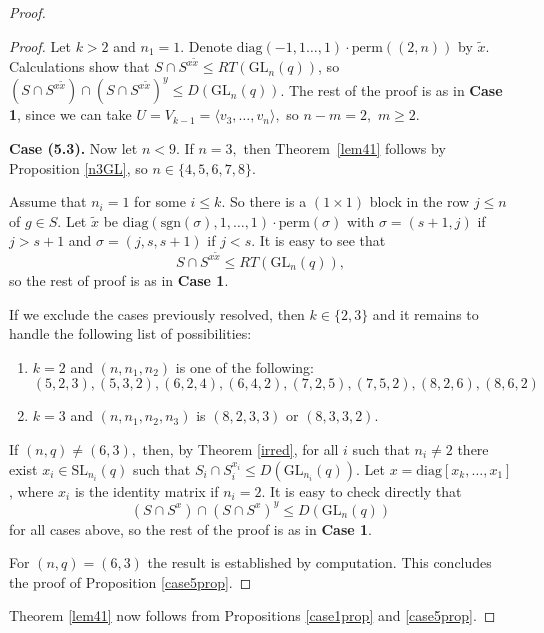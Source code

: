 \documentclass[a4paper,reqno,11pt]{amsart}
\theoremstyle{definition}
\theoremstyle{remark}
\numberwithin{equation}{section}
\newcommand{\diag}{\mathrm{diag}}
\newcommand{\sgn}{\mathrm{sgn}}
\newcommand{\per}{\mathrm{perm}}
\newcommand{\SL}{{\mathrm{SL}}}
\newcommand{\GL}{{\mathrm{GL}}}
\begin{document}
\begin{proof}
\begin{proof}
Let $k>2$ and $n_1=1.$ Denote $\diag(-1,1\ldots,1) \cdot \per((2,n))$ by $\tilde{x}$. Calculations show that  $S \cap S^{x \tilde{x}} \le RT(\GL_n(q))$, so $(S \cap S^{x \tilde{x}}) \cap (S \cap S^{x \tilde{x}})^y\le D(\GL_n(q))$. The rest of the proof is  as in {\bf Case 1}, since we can take $U=V_{k-1}=\langle v_3, \ldots, v_n \rangle,$ so $n-m=2,$ $m\ge 2.$

\medskip

{\bf Case (5.3).}  Now let $n<9.$ If $n=3,$ then Theorem~\ref{lem41} follows by Proposition \ref{n3GL}, so $n \in \{4,5,6,7,8\}$.

Assume that $n_i=1$ for some $i\le k$. So there is a $(1\times 1)$ block in the row $j \le n$ of $g \in S$. Let $\tilde{x}$ be $\diag(\sgn(\sigma), 1, \ldots, 1) \cdot \per(\sigma)$ with $\sigma=(s+1,j)$ if $j>s+1$ and  $\sigma=(j,s,s+1)$ if $j<s.$ It is easy to see that 
$$S \cap S^{x \tilde x}\le RT(\GL_n(q)),$$
so the rest of proof is  as in {\bf Case 1}.

If we exclude the cases previously resolved, then $k \in \{2,3\}$ and it remains to handle the following list of possibilities:
\begin{enumerate}
\item[$(a)$] $k=2$ and $(n,n_1,n_2)$ is one of the following:
$$(5,2,3), (5,3,2), (6,2,4), (6,4,2), (7,2,5), (7,5,2), (8,2,6), (8,6,2)$$
\item[$(b)$] $k=3$ and $(n, n_1, n_2, n_3)$ is $(8,2,3,3)$ or $(8,3,3,2).$
\end{enumerate}
If $(n,q) \ne (6,3),$ then, by Theorem \ref{irred}, for all $i$ such that $n_i\ne 2$  there exist $x_i \in \SL_{n_i}(q)$ such that $S_i \cap S_i^{x_i} \le D(\GL_{n_i}(q))$. Let $x=\diag[x_k, \ldots, x_1]$, where $x_i$ is the identity matrix  if $n_i=2$. It is easy to check directly that $$(S \cap S^x) \cap (S \cap S^x)^y \le D(\GL_n(q))$$
for all cases above, so the rest of the proof is  as in {\bf Case 1}.

  For $(n,q)=(6,3)$ the result is established by computation. This concludes the proof of Proposition \ref{case5prop}.
\end{proof}
  
 Theorem \ref{lem41}  now follows from     Propositions \ref{case1prop} and \ref{case5prop}.
\end{proof}
\end{document}
